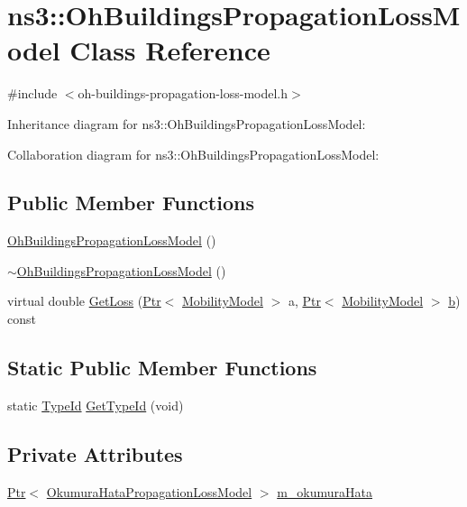 \hypertarget{classns3_1_1OhBuildingsPropagationLossModel}{}\section{ns3\+:\+:Oh\+Buildings\+Propagation\+Loss\+Model Class Reference}
\label{classns3_1_1OhBuildingsPropagationLossModel}


{\ttfamily \#include $<$oh-\/buildings-\/propagation-\/loss-\/model.\+h$>$}



Inheritance diagram for ns3\+:\+:Oh\+Buildings\+Propagation\+Loss\+Model\+:


Collaboration diagram for ns3\+:\+:Oh\+Buildings\+Propagation\+Loss\+Model\+:
\subsection*{Public Member Functions}
\begin{DoxyCompactItemize}
\item 
\hyperlink{classns3_1_1OhBuildingsPropagationLossModel_ada271b69a1512e6c8659f2f19c4794ad}{Oh\+Buildings\+Propagation\+Loss\+Model} ()
\item 
\hyperlink{classns3_1_1OhBuildingsPropagationLossModel_a53ff455d653bc87e3a0e4b7a8c70235b}{$\sim$\+Oh\+Buildings\+Propagation\+Loss\+Model} ()
\item 
virtual double \hyperlink{classns3_1_1OhBuildingsPropagationLossModel_a0e631c77b10ca758f41101751ca3635f}{Get\+Loss} (\hyperlink{classns3_1_1Ptr}{Ptr}$<$ \hyperlink{classns3_1_1MobilityModel}{Mobility\+Model} $>$ a, \hyperlink{classns3_1_1Ptr}{Ptr}$<$ \hyperlink{classns3_1_1MobilityModel}{Mobility\+Model} $>$ \hyperlink{lte__pathloss_8m_a21ad0bd836b90d08f4cf640b4c298e7c}{b}) const 
\end{DoxyCompactItemize}
\subsection*{Static Public Member Functions}
\begin{DoxyCompactItemize}
\item 
static \hyperlink{classns3_1_1TypeId}{Type\+Id} \hyperlink{classns3_1_1OhBuildingsPropagationLossModel_adacfe04d549b83bbaad33eb081892b8b}{Get\+Type\+Id} (void)
\end{DoxyCompactItemize}
\subsection*{Private Attributes}
\begin{DoxyCompactItemize}
\item 
\hyperlink{classns3_1_1Ptr}{Ptr}$<$ \hyperlink{classns3_1_1OkumuraHataPropagationLossModel}{Okumura\+Hata\+Propagation\+Loss\+Model} $>$ \hyperlink{classns3_1_1OhBuildingsPropagationLossModel_a1931526744ccd71a92eb64b321129c1b}{m\+\_\+okumura\+Hata}
\end{DoxyCompactItemize}
